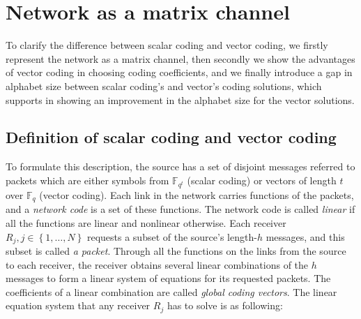 \chapter{Network as a matrix channel} \label{chap:network}

To clarify the difference between scalar coding and vector coding,
we firstly represent the network as a matrix channel, then secondly
we show the advantages of vector coding in choosing coding coefficients,
and we finally introduce a gap in alphabet size between scalar coding's
and vector's coding solutions, which supports in showing an improvement
in the alphabet size for the vector solutions. 

\section{Definition of scalar coding and vector coding}

To formulate this description, the source has a set of disjoint messages
referred to packets which are either symbols from $\ensuremath{\mathbb{F}}_{q^{t}}$
(scalar coding) or vectors of length $t$ over $\ensuremath{\mathbb{F}}_{q}$
(vector coding). Each link in the network carries functions of the
packets, and a \textit{network code} is a set of these functions.
The network code is called \textit{linear} if all the functions are
linear and nonlinear otherwise. Each receiver $R_{j},j\in\left\{ 1,\ldots,N\right\} $
requests a subset of the source's length-$h$ messages, and this subset
is called \textit{a packet}. Through all the functions on the links
from the source to each receiver, the receiver obtains several linear
combinations of the $h$ messages to form a linear system of equations
for its requested packets. The coefficients of a linear combination
are called \textit{global coding vectors}. The linear equation system
that any receiver $R_{j}$ has to solve is as following:

